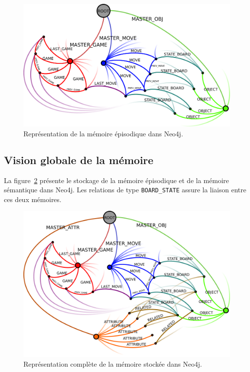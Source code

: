 \begin{figure}[H]
\includegraphics[width=\textwidth]{files/neo4j/episodic_graph}
\caption{Représentation de la mémoire épisodique dans Neo4j.}
\label{episodic_graph}
\end{figure}

\subsection{Vision globale de la mémoire}

La figure~\ref{full_graph} présente le stockage de la mémoire épisodique et de la mémoire sémantique dans Neo4j. Les relations de type \texttt{BOARD\_STATE} assure la liaison entre ces deux mémoires.
\begin{figure}[H]
\includegraphics[width=\textwidth]{files/neo4j/full_graph}
\caption{Représentation complète de la mémoire stockée dans Neo4j.}
\label{full_graph}
\end{figure}